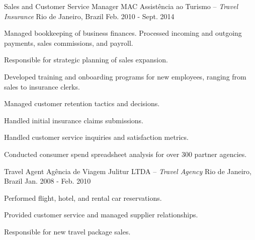 \begin{cventries}

\cventry
{Sales and Customer Service Manager} %
{MAC Assistência ao Turismo \textmd{-- \em{Travel Insurance}}} %
{Rio de Janeiro, Brazil} %
{Feb. 2010 - Sept. 2014} %
{ %
\begin{cvitems}
\item {Managed bookkeeping of business finances. Processed incoming and outgoing payments, sales commissions, and payroll.}
\item {Responsible for strategic planning of sales expansion.}
\item {Developed training and onboarding programs for new employees, ranging from sales to insurance clerks.}
\item {Managed customer retention tactics and decisions.}
\item {Handled initial insurance claims submissions.}
\item {Handled customer service inquiries and satisfaction metrics.}
\item {Conducted consumer spend spreadsheet analysis for over 300 partner agencies.}
\end{cvitems}
}

\cventry
{Travel Agent} %
{Agência de Viagem Julitur LTDA \textmd{-- \em{Travel Agency}}} %
{Rio de Janeiro, Brazil} %
{Jan. 2008 - Feb. 2010} %
{ %
\begin{cvitems}
\item{Performed flight, hotel, and rental car reservations.}
\item{Provided customer service and managed supplier relationships.}
\item{Responsible for new travel package sales.}
\end{cvitems}
}


\end{cventries}